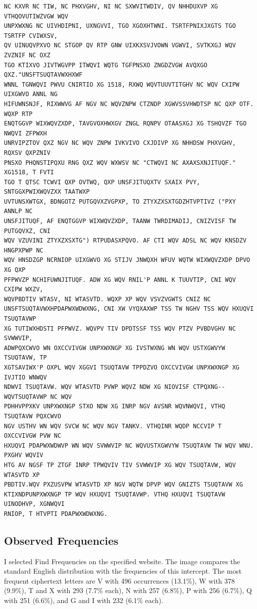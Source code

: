 \documentclass[12pt,a4paper]{article}
\begin{document}
\begin{lstlisting}[caption={Variant 9 intercepted ciphertext}, label={lst:intercept}]
NC KXVR NC TIW, NC PHXVGHV, NI NC SXWVITWDIV, QV NHHDUXVP XG VTHQOVUTIWZVGW WQV
UNPXWXNG NC UIVHDIPNI, UXNGVVI, TGO XGOXHTWNI. TSRTFPNIXJXGTS TGO TSRTFP CVIWXSV,
QV UINUQVPXVO NC STGOP QV RTP GNW UIXKXSVJVOWN VGWVI, SVTKXGJ WQV ZVZNIF NC OXZ
TGO KTIXVO JIVTWGVPP ITWQVI WQTG TGFPNSXO ZNGDZVGW AVQXGO QXZ."UNSFTSUQTAVWXHXWF
WNNL TGNWQVI PWVU CNIRTIO XG 1518, RXWQ WQVTUUVTITGHV NC WQV CXIPW UIXGWVO ANNL NG
HIFUWNSNJF, RIXWWVG AF NGV NC WQVZNPW CTZNDP XGWVSSVHWDTSP NC QXP OTF. WQXP RTP
ENQTGGVP WIXWQVZXDP, TAVGVOXHWXGV ZNGL RQNPV OTAASXGJ XG TSHQVZF TGO NWQVI ZFPWXH
UNRVIPZTOV QXZ NGV NC WQV ZNPW IVKVIVO CXJDIVP XG NHHDSW PHXVGHV, RQXSV QXPZNIV
PNSXO PHQNSTIPQXU RNG QXZ WQV WXWSV NC "CTWQVI NC AXAXSXNJITUQF." XG1518, T FVTI
TGO T QTSC TCWVI QXP OVTWQ, QXP UNSFJITUQXTV SXAIX PVY, SNTGGXPWIXWQVZXX TAATWXP
UVTUNSXWTGX, BDNGOTZ PUTGQVXZVGPXP, TO ZTYXZXSXTGDZHTVPTIVZ ("PXY ANNLP NC
UNSFJITUQF, AF ENQTGGVP WIXWQVZXDP, TAANW TWRDIMADIJ, CNIZVISF TW PUTGQVXZ, CNI
WQV VZUVINI ZTYXZXSXTG") RTPUDASXPQVO. AF CTI WQV ADSL NC WQV KNSDZV HNGPXPWP NC
WQV HNSDZGP NCRNIOP UIXGWVO XG STIJV JNWQXH WFUV WQTW WIXWQVZXDP DPVO XG QXP
PFPWVZP NCHIFUWNJITUQF. ADW XG WQV RNIL'P ANNL K TUUVTIP, CNI WQV CXIPW WXZV,
WQVPBDTIV WTASV, NI WTASVTD. WQXP XP WQV VSVZVGWTS CNIZ NC
UNSFTSUQTAVWXHPDAPWXWDWXNG, CNI XW VYQXAXWP TSS TW NGHV TSS WQV HXUQVI TSUQTAVWP
XG TUTIWXHDSTI PFPWVZ. WQVPV TIV DPDTSSF TSS WQV PTZV PVBDVGHV NC SVWWVIP,
ADWPQXCWVO WN OXCCVIVGW UNPXWXNGP XG IVSTWXNG WN WQV USTXGWVYW TSUQTAVW, TP
XGTSAVIWX'P OXPL WQV XGGVI TSUQTAVW TPPDZVO OXCCVIVGW UNPXWXNGP XG IVJTIO WNWQV
NDWVI TSUQTAVW. WQV WTASVTD PVWP WQVZ NDW XG NIOVISF CTPQXNG--WQVTSUQTAVWP NC WQV
PDHHVPPXKV UNPXWXNGP STXO NDW XG INRP NGV AVSNR WQVNWQVI, VTHQ TSUQTAVW PQXCWVO
NGV USTHV WN WQV SVCW NC WQV NGV TANKV. VTHQINR WQDP NCCVIP T OXCCVIVGW PVW NC
HXUQVI PDAPWXWDWVP WN WQV SVWWVIP NC WQVUSTXGWVYW TSUQTAVW TW WQV WNU. PXGHV WQVIV
HTG AV NGSF TP ZTGF INRP TPWQVIV TIV SVWWVIP XG WQV TSUQTAVW, WQV WTASVTD XP
PBDTIV.WQV PXZUSVPW WTASVTD XP NGV WQTW DPVP WQV GNIZTS TSUQTAVW XG
KTIXNDPUNPXWXNGP TP WQV HXUQVI TSUQTAVWP. VTHQ HXUQVI TSUQTAVW UINODHVP, XGNWQVI
RNIOP, T HTVPTI PDAPWXWDWXNG.
\end{lstlisting}

\newpage
\subsection{Observed Frequencies}
I selected Find Frequencies on the specified website. The image compares the standard English distribution with the frequencies of this intercept. The most frequent ciphertext letters are V with 496 occurrences (13.1\%), W with 378 (9.9\%), T and X with 293 (7.7\% each), N with 257 (6.8\%), P with 256 (6.7\%), Q with 251 (6.6\%), and G and I with 232 (6.1\% each).
\end{document}

